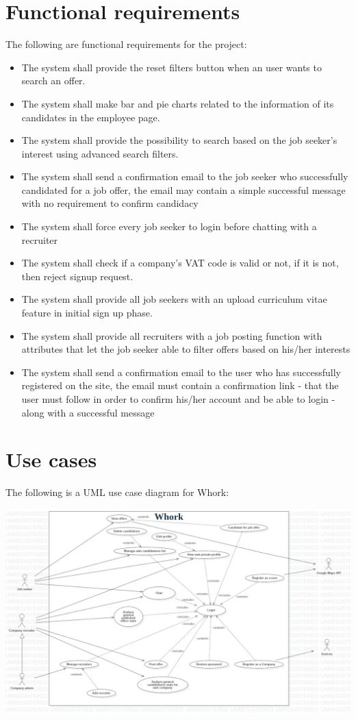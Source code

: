 \documentclass[12pt, a4paper]{article}
\begin{document}
\section{Functional requirements}
The following are functional requirements for the project:
\begin{itemize}
	\item The system shall provide the reset filters button when an user wants to search an offer.                                                       
	\item The system shall make bar and pie charts related to the information of its candidates in the employee page.                     
	\item The system shall provide the possibility to search based on the job seeker's interest using advanced search filters.
	\item The system shall send a confirmation email to the job seeker who successfully candidated for a job offer, 
		the email may contain a simple successful message with no requirement to confirm candidacy
	\item The system shall force every job seeker to login before chatting with a recruiter
	\item The system shall check if a company's VAT code is valid or not, if it is not, then reject signup request.
	\item The system shall provide all job seekers with an upload curriculum vitae feature in initial sign up phase.
	\item The system shall provide all recruiters with a job posting function with attributes that let the job seeker 
		able to filter offers based on his/her interests
	\item The system shall send a confirmation email to the user who has successfully registered on the site, 
		the email must contain a confirmation link - that the user must follow in order to confirm his/her account 
		and be able to login - along with a successful message
\end{itemize}

\section{Use cases}
The following is a UML use case diagram for Whork:

\begin{center}
	\includegraphics[scale=1.7]{diagrams/project/usecase/usecase_scaled.jpg}
\end{center}
\end{document}
